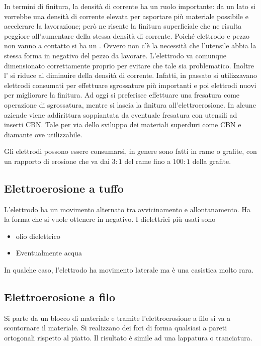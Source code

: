 In termini di finitura, la densità di corrente ha un ruolo importante: da un lato si vorrebbe una densità di corrente elevata per asportare più materiale possibile e accelerare la lavorazione; però ne risente la finitura superficiale che ne risulta peggiore all'aumentare della stessa densità di corrente.
Poiché elettrodo e pezzo non vanno a contatto si ha un . Ovvero non c'è la necessità che l'utensile abbia la stessa forma in negativo del pezzo da lavorare. L'elettrodo va comunque dimensionato correttamente proprio per evitare che tale  sia problematico.
Inoltre l' si riduce al diminuire della densità di corrente.
Infatti, in passato si utilizzavano elettrodi consumati per effettuare sgrossature più importanti e poi elettrodi nuovi per migliorare la finitura.
Ad oggi si preferisce effettuare una fresatura come operazione di sgrossatura, mentre si lascia la finitura all'elettroerosione.
In alcune aziende viene addirittura soppiantata da eventuale fresatura con utensili ad inserti CBN. Tale per via dello sviluppo dei materiali superduri come CBN e diamante ove utilizzabile.

Gli elettrodi possono essere consumarsi, in genere sono fatti in rame o grafite, con un rapporto di erosione che va dai $3:1$ del rame fino a $100:1$ della grafite.

\subsection{Elettroerosione a tuffo}
L'elettrodo ha un movimento alternato tra avvicinamento e allontanamento.
Ha la forma che si vuole ottenere in negativo.
I dielettrici più usati sono
\begin{itemize}
\item olio dielettrico
\item Eventualmente acqua
\end{itemize}
In qualche caso, l'elettrodo ha movimento laterale ma è una casistica molto rara.

\subsection{Elettroerosione a filo}
Si parte da un blocco di materiale e tramite l'elettroerosione a filo si va a scontornare il materiale.
Si realizzano dei fori di forma qualsiasi a pareti ortogonali rispetto al piatto. Il risultato è simile ad una lappatura o tranciatura.

